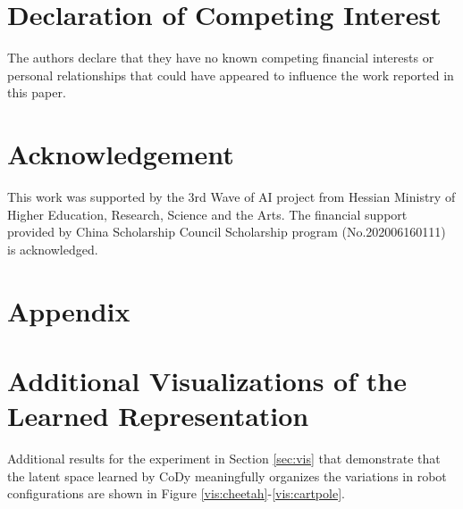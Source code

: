 \documentclass[a4paper,12pt]{article}
\begin{document}
    

\section*{Declaration of Competing Interest}
The authors declare that they have no known competing financial interests or personal relationships that could have appeared to influence the work reported in this paper.

\section*{Acknowledgement}
This work was supported by the 3rd Wave of AI project from Hessian Ministry of Higher Education, Research, Science and the Arts. The financial support provided by China Scholarship Council Scholarship program (No.202006160111) is acknowledged.

\section*{Appendix}
\appendix
{} %
{}%
\setcounter{section}{0}%
\renewcommand{\thesection}{\Alph{section}}%

\section{Additional Visualizations of the Learned Representation}
\label{Additive Representation Visualization}
Additional results for the experiment in Section \ref{sec:vis} that demonstrate that the latent space learned by CoDy meaningfully organizes the variations in robot configurations are shown in Figure \ref{vis:cheetah}-\ref{vis:cartpole}.
\end{document}
